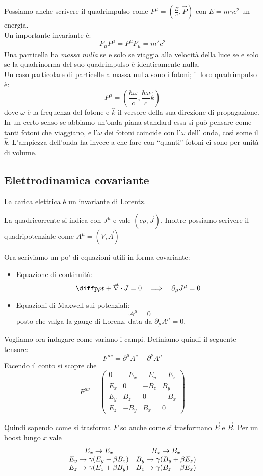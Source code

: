 \documentclass[a4paper,10pt,oneside]{math_article}
\renewcommand{\div}{\vec{\nabla} \cdot}
\newcommand{\dalamb}{\square}
\begin{document}
			Possiamo anche scrivere il quadrimpulso come $P^\mu = (\frac Ec, \vec P)$ con $E=m\gamma c^2$ un energia.\\
			Un importante invariante è:
			\[
				P_\mu P^\mu=P^\mu P_\mu=m^2 c^2
			\]
			Una particella ha {\it massa nulla} se e solo se viaggia alla velocità della luce se e solo se la quadrinorma del suo quadrimpulso è identicamente nulla.\\
			Un caso particolare di particelle a massa nulla sono i fotoni; il loro quadrimpulso è:
			\[	
				P^\mu=\left(\frac{\hbar \omega}{c},\frac{\hbar \omega}{c}\hat k\right)
			\]
			dove $\omega$ è la frequenza del fotone e $\hat k$ il versore della sua direzione di propagazione.
			In un certo senso se abbiamo un'onda piana standard essa si può pensare come tanti fotoni che viaggiano, e l'$\omega$ dei fotoni coincide con l'$\omega$ dell' onda, così some il $\hat k$. L'ampiezza dell'onda ha invece a che fare con ``quanti'' fotoni ci sono per unità di volume.
			
		\subsection{Elettrodinamica covariante}
			La carica elettrica è un invariante di Lorentz.
			
			La quadricorrente si indica con $J^\mu$ e vale $(c\rho,\vec J)$. Inoltre possiamo scrivere il quadripotenziale come $A^\mu= (V,\vec A)$
			
			Ora scriviamo un po' di equazioni utili in forma covariante:
			\begin{itemize}
				\item Equazione di continuità:
					\[
						\diffp \rho t + \div J = 0 \quad\Longrightarrow\quad \partial_\mu J^\mu = 0
					\]
				\item Equazioni di Maxwell sui potenziali:
					\[
						\dalamb A^\mu = 0
					\]
					posto che valga la gauge di Lorenz, data da $\partial_\mu A^\mu =0$.
			\end{itemize}
			
			Vogliamo ora indagare come variano i campi. Definiamo quindi il seguente tensore:
			\[
				F^{\mu\nu} = \partial^\mu A^\nu - \partial^\nu A^\mu
			\]
			Facendo il conto si scopre che 
			\[
				F^{\mu\nu} = \left(
				\begin{array}{c|ccc}
					0		&	-E_x	& -E_y	& -E_z \\
					\hline 
					E_x	&		0		& -B_z	&  B_y \\
					E_y &  B_z	& 	0		&	-B_x \\
					E_z & -B_y	&  B_x 	& 	0
				\end{array}
				\right)
			\]
			
			Quindi sapendo come si trasforma $F$ so anche come si trasformano $\vec E$ e $\vec B$. Per un boost lungo $x$ vale 
			\[
			 \begin{array}{cc}
				E_x \rightarrow E_x												& B_x \rightarrow B_x											\\
				E_y \rightarrow \gamma (E_y - \beta B_z) 	& B_y \rightarrow \gamma (B_y + \beta E_z) \\
				E_z \rightarrow \gamma (E_z + \beta B_y) 	& B_z \rightarrow \gamma (B_z - \beta E_x)
			 \end{array}
			\]
	
\end{document}
